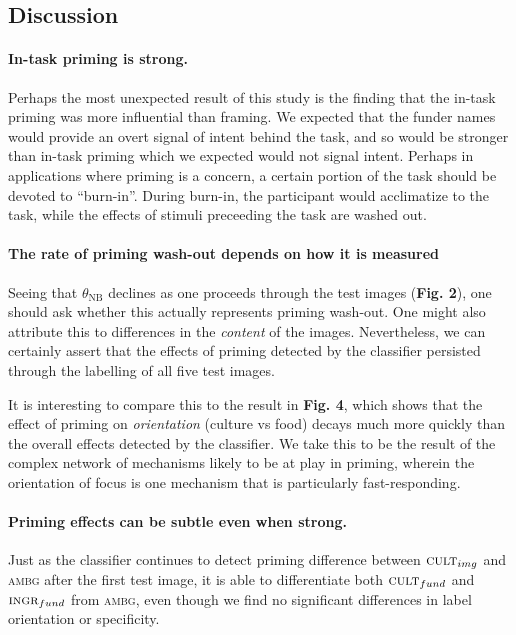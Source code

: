 \documentclass[a4paper]{report}
\begin{document}
\subsection*{Discussion}

\paragraph{In-task priming is strong.}  Perhaps the most unexpected result of 
this study is the finding that the in-task priming was more influential than
framing.  We expected that the funder names would provide an overt signal of 
intent behind the task, and so would be stronger than in-task priming which 
we expected would not signal intent.  Perhaps in applications where priming 
is a concern, a certain portion of the task should be devoted to  
``burn-in''.  During burn-in, the participant would acclimatize to the task, 
while the effects of stimuli preceeding the task are washed out.

\paragraph{The rate of priming wash-out depends on how it is measured}
Seeing that $\theta_\text{NB}$ declines as one proceeds through the test 
images (\textbf{Fig. 2}), one should ask whether this actually represents 
priming wash-out.  One might also attribute this to 
differences in the \textit{content} of the images.  Nevertheless, we can
certainly assert that the effects of priming detected by the classifier 
persisted through the labelling of all five test images.  

It is interesting to compare this to the result in \textbf{Fig. 4}, which
shows that the effect of priming on \textit{orientation} (culture vs food) 
decays much more quickly than the overall effects detected by
the classifier.  We take this to be the result of the complex network of 
mechanisms likely to be at play in priming, wherein the orientation of focus
is one mechanism that is particularly fast-responding.


\paragraph{Priming effects can be subtle even when strong.}
Just as the classifier continues to detect priming difference between 
$\textsc{cult}_{img}$ and \textsc{ambg} after the first test image,
it is able to differentiate both $\textsc{cult}_{fund}$ and 
$\textsc{ingr}_{fund}$ from \textsc{ambg}, even though we find no significant
differences in label orientation or specificity.  
\end{document}
